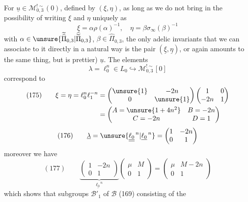For $\underline u\in\mathcal M_{0,3}^{!\sim}(0)$, defined by
$(\xi,\eta)$, as long as we do not bring in the
possibility of writing $\xi$ and $\eta$ uniquely as
\[
\xi=\alpha\rho(\alpha)^{-1},\quad
\eta=\beta\sigma_\infty(\beta)^{-1}
\]
with $\alpha\in\unsure{\widetilde{\widehat\Pi}_{0,3}|\widehat{\widetilde\Pi}_{0,3}}$,
$\beta\in\widehat\Pi_{0,3}$, the only adelic invariants that we
can associate to it directly in a natural way is the pair
$(\underline\xi,\underline\eta)$, or again  amounts to the
same thing, but is prettier) $\underline u$.
The elements 
\[
\lambda=\ell_0^n\in L_0\hookrightarrow\mathcal M_{0,3}^{!\sim}[0]
\]
correspond to
\[
\begin{aligned}
(175)\qquad
\xi=\eta=\ell_0^n\ell_1^{-n}
&=\begin{pmatrix}\unsure{1}&-2n\\0&\unsure{1}\end{pmatrix}
\begin{pmatrix}1&0\\-2n&1\end{pmatrix}\\
&=\begin{pmatrix}A=\unsure{1+4n^2}&B=-2n\\C=-2n&D=1\end{pmatrix}
\end{aligned}
\]
\[
(176)\qquad
\underline\lambda=\unsure{\underline{\underline{\ell_0}}^{\,n}|\underline{\ell_0}^{\,n}}
=\begin{pmatrix}1&-2n\\0&1\end{pmatrix}
\]
moreover we have
\[
(177)\qquad
\underbrace{\begin{pmatrix}1&-2n\\0&1\end{pmatrix}}_{\underline{\ell_0}^{\,n}}
\begin{pmatrix}\mu&M\\0&1\end{pmatrix}
=\begin{pmatrix}\mu&M-2n\\0&1\end{pmatrix}
\]
which shows that 
subgroups $\mathcal B'_1$ of $\mathcal B$ (169) consisting of the
